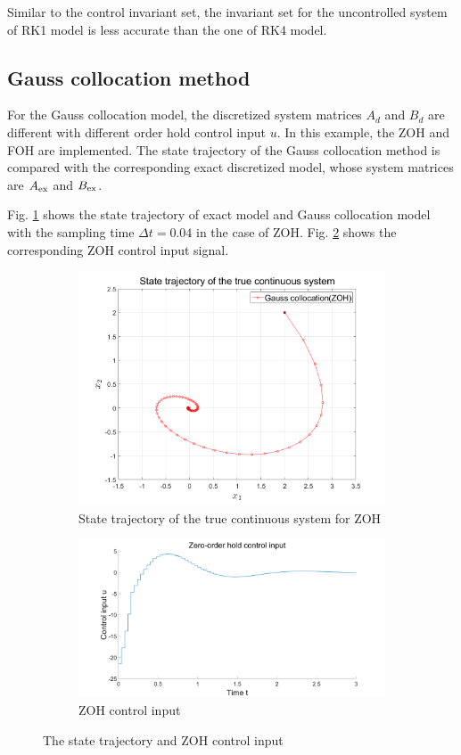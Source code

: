 Similar to the control invariant set, the invariant set for the uncontrolled system of RK1 model is less accurate than the one of RK4 model.
\subsection{Gauss collocation method}
For the Gauss collocation model, the discretized system matrices $A_d$ and $B_d$ are different with different order hold control input $u$. In this example, the ZOH and FOH are implemented. The state trajectory of the Gauss collocation method is compared with the corresponding exact discretized model, whose system matrices are $A_{\rm{ex}}$ and $B_{\rm{ex}}$.

Fig. \ref{fig:gczero.png} shows the state trajectory of exact model and Gauss collocation model with the sampling time $\Delta t = 0.04$ in the case of ZOH. Fig. \ref{fig:ZOHINPUT} shows the corresponding ZOH control input signal.
\begin{figure}[h!]
	\centering
	\begin{subfigure}[b]{0.37\textwidth}
		\centering
		\includegraphics[width=\linewidth]{pics/gczero.png}
		\caption{State trajectory of the true continuous system for ZOH}
		\label{fig:gczero.png}
	\end{subfigure}
	\hfill
	\begin{subfigure}[b]{0.37\textwidth}
		\includegraphics[width=\linewidth]{pics/ZOHINPUT.png}
		\caption{ZOH control input}
		\label{fig:ZOHINPUT}
	\end{subfigure}
	\caption{The state trajectory and ZOH control input}
	\label{fig:The ZOH}
\end{figure}

